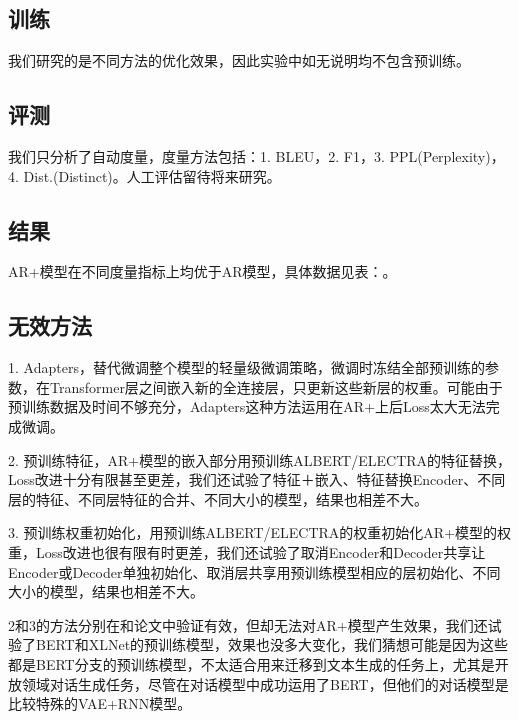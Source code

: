 \documentclass[letterpaper]{article} %
\DeclareRobustCommand{\citeext}[1]{\cite[#1]{#1}}
\begin{document}
\begin{CJK*}{UTF8}{gbsn}
\subsection[Training]{训练}
我们研究的是不同方法的优化效果，因此实验中如无说明均不包含预训练。

\subsection[Evaluation]{评测} 
我们只分析了自动度量，度量方法包括：1. BLEU\citeext{Papineni2002}，2. F1，3. PPL(Perplexity)，4. Dist.(Distinct)\citeext{Li2016}。人工评估留待将来研究。

\subsection[Result]{结果} 
AR+模型在不同度量指标上均优于AR模型，具体数据见表：。


\subsection[Ineffective Methods]{无效方法} 
1. Adapters\citeext{Houlsby2019}，替代微调整个模型的轻量级微调策略，微调时冻结全部预训练的参数，在Transformer层之间嵌入新的全连接层，只更新这些新层的权重。可能由于预训练数据及时间不够充分，Adapters这种方法运用在AR+上后Loss太大无法完成微调。

2. 预训练特征\citeext{Devlin2019}，AR+模型的嵌入部分用预训练ALBERT\citeext{Lan2019}/ELECTRA\citeext{Clark2020}的特征替换，Loss改进十分有限甚至更差，我们还试验了特征＋嵌入、特征替换Encoder、不同层的特征、不同层特征的合并、不同大小的模型，结果也相差不大。

3. 预训练权重初始化\citeext{Ziegler2019}，用预训练ALBERT/ELECTRA的权重初始化AR+模型的权重，Loss改进也很有限有时更差，我们还试验了取消Encoder和Decoder共享让Encoder或Decoder单独初始化、取消层共享用预训练模型相应的层初始化、不同大小的模型，结果也相差不大。

2和3的方法分别在\citeext{Devlin2019}和\citeext{Zhao2019}论文中验证有效，但却无法对AR+模型产生效果，我们还试验了BERT和XLNet的预训练模型，效果也没多大变化，我们猜想可能是因为这些都是BERT分支的预训练模型，不太适合用来迁移到文本生成的任务上，尤其是开放领域对话生成任务，尽管\citeext{Zhao2019}在对话模型中成功运用了BERT，但他们的对话模型是比较特殊的VAE+RNN模型。


\end{CJK*}
\end{document}
